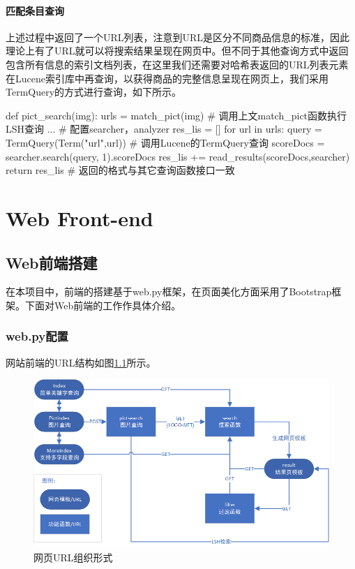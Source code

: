 \subsection{匹配条目查询}

上述过程中返回了一个URL列表，注意到URL是区分不同商品信息的标准，因此理论上有了URL就可以将搜索结果呈现在网页中。但不同于其他查询方式中返回包含所有信息的索引文档列表，在这里我们还需要对哈希表返回的URL列表元素在Lucene索引库中再查询，以获得商品的完整信息呈现在网页上，我们采用TermQuery的方式进行查询，如下所示。

\begin{python}
def pict_search(img):
    urls = match_pict(img)             # 调用上文match_pict函数执行LSH查询
    ... # 配置searcher，analyzer
    res_lis = []
    for url in urls:
        query = TermQuery(Term("url",url))   # 调用Lucene的TermQuery查询
        scoreDocs = searcher.search(query, 1).scoreDocs
        res_lis += read_results(scoreDocs,searcher)
    return res_lis                     # 返回的格式与其它查询函数接口一致
\end{python}


\part{Web Front-end}

\chapter{Web前端搭建}

在本项目中，前端的搭建基于web.py框架，在页面美化方面采用了Bootstrap框架。下面对Web前端的工作作具体介绍。

\section{web.py配置}

网站前端的URL结构如图\ref{fig:zlt_url}所示。

\begin{figure}[htbp]
\centering
\includegraphics[width=13.5cm]{img/zlt/url.png}
\caption{网页URL组织形式}
\label{fig:zlt_url}
\end{figure}

